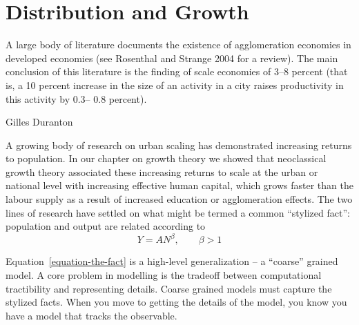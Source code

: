 \chapter{Distribution and Growth} \label{chapter-distribution}

\epigraph{A large body of literature documents the existence of agglomeration economies in developed economies (see Rosenthal and Strange 2004 for a review). The main conclusion of this literature is the finding of scale economies of 3–8 percent (that is, a 10 percent increase in the size of an activity in a city raises productivity in this activity by 0.3– 0.8 percent).}{Gilles Duranton \cite{durantonAreCitiesEngines2009}} 



A growing body of research on urban scaling has demonstrated increasing returns to population. In our chapter on growth theory we showed that neoclassical growth theory associated these increasing returns to scale at the urban or national level with increasing effective human capital, which grows faster than the labour supply as a result of increased education or agglomeration effects. The two lines of research have settled on what might be termed a  common ``stylized  fact'': population and output are related according to 
\begin{equation}
    Y=AN^\beta,\qquad \beta>1 \label{equation-the-fact}
\end{equation}

Equation~\ref{equation-the-fact}  is a high-level generalization -- a ``coarse'' grained model.
A core problem in modelling is the tradeoff between computational tractibility and representing details. 
Coarse grained models must capture the stylized facts.
When you move to getting the details of the model, you know you have a model that tracks the observable. 

